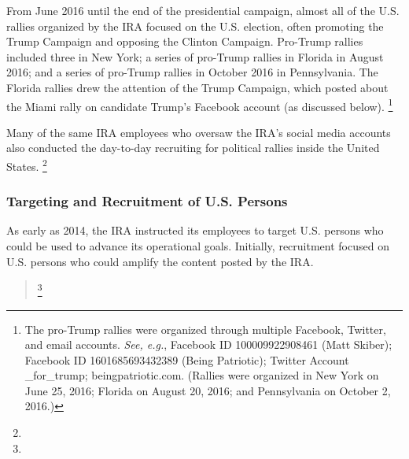 From June 2016 until the end of the presidential campaign, almost all of the U.S. rallies organized by the IRA focused on the U.S. election, often promoting the Trump Campaign and opposing the Clinton Campaign.
Pro-Trump rallies included three in New York; a series of pro-Trump rallies in Florida in August 2016; and a series of pro-Trump rallies in October 2016 in Pennsylvania.
The Florida rallies drew the attention of the Trump Campaign, which posted about the Miami rally on candidate Trump's Facebook account (as discussed below).%
\footnote{The pro-Trump rallies were organized through multiple Facebook, Twitter, and email accounts.
\textit{See, e.g.}, Facebook ID 100009922908461 (Matt Skiber);
Facebook ID 1601685693432389 (Being Patriotic);
Twitter Account \@march\_for\_trump;
beingpatriotic\@gmail.com.
(Rallies were organized in New York on June 25, 2016; Florida on August 20, 2016; and Pennsylvania on October 2, 2016.)}

Many of the same IRA employees who oversaw the IRA's social media accounts also conducted the day-to-day recruiting for political rallies inside the United States.
\footnote{}

\subsubsection{Targeting and Recruitment of U.S. Persons}

As early as 2014, the IRA instructed its employees to target U.S. persons who could be used to advance its operational goals.
Initially, recruitment focused on U.S. persons who could amplify the content posted by the IRA.

\begin{quote}
\footnote{}
\end{quote}

